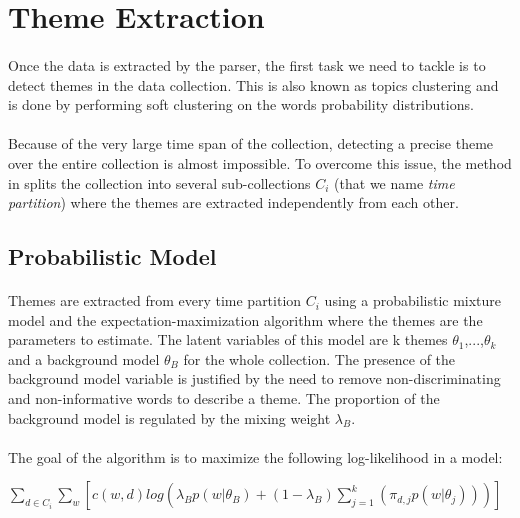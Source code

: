 \section{Theme Extraction}
\label{sec:themeExtraction}

\paragraph{}
Once the data is extracted by the parser, the first task we need to tackle is to detect themes in the data collection. This is also known as topics clustering and is done by performing soft clustering on the words probability distributions.

\paragraph{}
Because of the very large time span of the collection, detecting a precise theme over the entire collection is almost impossible. To overcome this issue, the method in \cite{kdd05-ttm} splits the collection into several sub-collections $C_{i}$ (that we name \emph{time partition}) where the themes are extracted independently from each other.

\subsection{Probabilistic Model}

\paragraph{}
Themes are extracted from every time partition $C_{i}$ using a probabilistic mixture model and the expectation-maximization algorithm where the themes are the parameters to estimate. The latent variables of this model are k themes  $\theta_{1}$,...,$\theta_{k}$ and a background model $\theta_{B}$ for the whole collection. The presence of the background model variable is justified by the need to remove non-discriminating and non-informative words to describe a theme. The proportion of the background model is regulated by the mixing weight $\lambda_{B}$.

\paragraph{}
The goal of the algorithm is to maximize the following log-likelihood in a model:

\begin{center}

$
\sum_{d\in C_{i}} \sum_{w} [c(w,d)log(\lambda_{B}p(w|\theta_{B}) + (1-\lambda_{B})\sum_{j=1}^{k} (\pi_{d,j} p(w|\theta_{j})))]  
$

\end{center}

